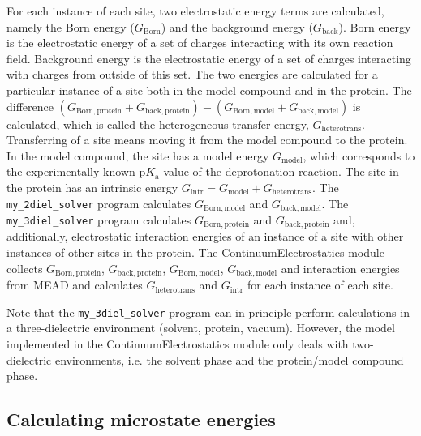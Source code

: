 \documentclass[a4paper,11pt]{article}
\newcommand{\modulename}{ContinuumElectrostatics\xspace}
\newcommand{\pka}{$\mathrm{p}K_{\mathrm{a}}$\xspace}
\begin{document}
For each instance of each site, two electrostatic energy terms are calculated, namely
the Born energy ($G_{\mathrm{Born}}$) and the background energy ($G_{\mathrm{back}}$).
%
Born energy is the electrostatic energy of a set of charges interacting with its own
reaction field.
%
Background energy is the electrostatic energy of a set of charges interacting with
charges from outside of this set.
%
The two energies are calculated for a particular instance of a site both in the model compound
and in the protein.
%
The difference
$(G_{\mathrm{Born, protein}} + G_{\mathrm{back, protein}}) - (G_{\mathrm{Born, model}} + G_{\mathrm{back, model}})$
is calculated, which is called the heterogeneous transfer energy, $G_{\mathrm{heterotrans}}$.
%
Transferring of a site means moving it from the model compound to the protein.
%
In the model compound, the site has a model energy $G_{\mathrm{model}}$, which
corresponds to the experimentally known \pka value of the deprotonation reaction.
%
The site in the protein has an intrinsic energy $G_{\mathrm{intr}} = G_{\mathrm{model}} + G_{\mathrm{heterotrans}}$.
%
The \texttt{my\_2diel\_solver} program calculates $G_{\mathrm{Born, model}}$ and $G_{\mathrm{back, model}}$.
%
The \texttt{my\_3diel\_solver} program calculates $G_{\mathrm{Born, protein}}$ and $G_{\mathrm{back, protein}}$
and, additionally, electrostatic interaction energies of an instance of a site
with other instances of other sites in the protein.
%
The \modulename module collects 
$G_{\mathrm{Born, protein}}$, $G_{\mathrm{back, protein}}$, 
$G_{\mathrm{Born, model}}$, $G_{\mathrm{back, model}}$ and interaction energies from MEAD 
and calculates $G_{\mathrm{heterotrans}}$ and $G_{\mathrm{intr}}$ for each instance of each site.

Note that the \texttt{my\_3diel\_solver} program can in principle perform calculations
in a three-dielectric environment (solvent, protein, vacuum).
%
However, the model implemented in the \modulename module only deals with two-dielectric environments, 
i.e. the solvent phase and the protein/model compound phase.


\subsection{Calculating microstate energies}
\end{document}
